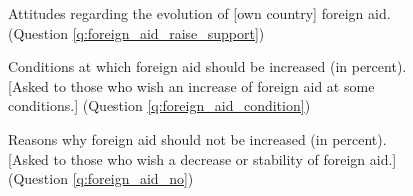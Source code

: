 \begin{figure}[h!]
  \caption[Attitudes on the evolution of foreign aid]{Attitudes regarding the evolution of [own country] foreign aid. (Question \ref{q:foreign_aid_raise_support})}\label{fig:foreign_aid_raise_support}
\end{figure}

\begin{figure}[h!]
  \caption[Conditions at which foreign aid should be increased]{Conditions at which foreign aid should be increased (in percent). [Asked to those who wish an increase of foreign aid at some conditions.] (Question \ref{q:foreign_aid_condition})}\label{fig:foreign_aid_condition}
\end{figure}

\begin{figure}[h!]
  \caption[Reasons why foreign aid should not be increased]{Reasons why foreign aid should not be increased (in percent). [Asked to those who wish a decrease or stability of foreign aid.] (Question \ref{q:foreign_aid_no})}\label{fig:foreign_aid_no}
\end{figure}

